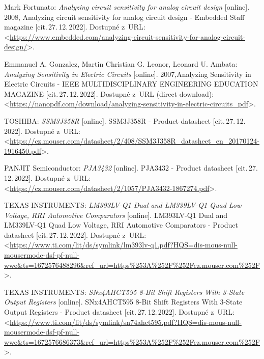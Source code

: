 \begin{thebibliography}{99}
    Mark Fortunato:
    \emph{Analyzing circuit sensitivity for analog circuit design}\/ [online].
    2008, Analyzing circuit sensitivity for analog circuit design - Embedded Staff magazine [cit.\,27.\,12.\,2022].
    Dostupné z~URL:\\
    <\url{https://www.embedded.com/analyzing-circuit-sensitivity-for-analog-circuit-design/}>.

    Emmanuel A. Gonzalez,  Martin Christian G. Leonor, Leonard U. Ambata:
    \emph{Analyzing Sensitivity in Electric Circuits}\/ [online].
    2007,Analyzing Sensitivity in Electric Circuits - IEEE MULTIDISCIPLINARY ENGINEERING EDUCATION MAGAZINE [cit.\,27.\,12.\,2022].
    Dostupné z~URL (direct download):\\
    <\url{https://nanopdf.com/download/analyzing-sensitivity-in-electric-circuits_pdf}>.

  
    TOSHIBA:
    \emph{SSM3J358R}\/ [online].
    SSM3J358R - Product datasheet [cit.\,27.\,12.\,2022].
    Dostupné z~URL:\\
    <\url{https://cz.mouser.com/datasheet/2/408/SSM3J358R_datasheet_en_20170124-1916450.pdf}>.

    PANJIT Semiconductor:
    \emph{PJA3432}\/ [online].
    PJA3432 - Product datasheet [cit.\,27.\,12.\,2022].
    Dostupné z~URL:\\
    <\url{https://cz.mouser.com/datasheet/2/1057/PJA3432-1867274.pdf}>.

    TEXAS INSTRUMENTS:
    \emph{LM393LV-Q1 Dual and LM339LV-Q1 Quad Low Voltage, RRI Automotive Comparators}\/ [online].
    LM393LV-Q1 Dual and LM339LV-Q1 Quad Low Voltage, RRI Automotive Comparators - Product datasheet [cit.\,27.\,12.\,2022].
    Dostupné z~URL:\\
    <\url{https://www.ti.com/lit/ds/symlink/lm393lv-q1.pdf?HQS=dis-mous-null-mousermode-dsf-pf-null-wwe&ts=1672576488296&ref_url=https%253A%252F%252Fcz.mouser.com%252F}>.

   
    TEXAS INSTRUMENTS:
    \emph{SNx4AHCT595 8-Bit Shift Registers With 3-State Output Registers}\/ [online].
    SNx4AHCT595 8-Bit Shift Registers With 3-State Output Registers - Product datasheet [cit.\,27.\,12.\,2022].
    Dostupné z~URL:\\
    <\url{https://www.ti.com/lit/ds/symlink/sn74ahct595.pdf?HQS=dis-mous-null-mousermode-dsf-pf-null-wwe&ts=1672576686373&ref_url=https%253A%252F%252Fcz.mouser.com%252F}>.


\end{thebibliography}
